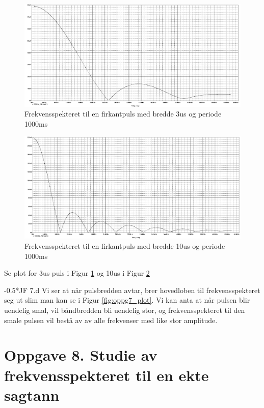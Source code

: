 \documentclass[norsk, a4paper]{article}
\makeatletter
\renewcommand{\subsubsection}{\@startsection{subsubsection}{3}{-2cm}%
{-\baselineskip}{0.5\baselineskip}{\bf\large}}
\newcommand{\jf}[1]{\subsubsection*{JF #1}\vspace*{-2\baselineskip}}
\makeatother
\begin{document}
\begin{figure}
  \begin{center}
      \includegraphics[width= 1\textwidth]{Figurer/oppg7_3us.png}
       \caption{Frekvensspekteret til en firkantpuls med bredde 3us og periode 1000ms}\label{fig:oppg7_3us}
  \end{center}
\end{figure}
\begin{figure}
  \begin{center}
      \includegraphics[width= 1\textwidth]{Figurer/oppg7_10us.png}
       \caption{Frekvensspekteret til en firkantpuls med bredde 10us og periode 1000ms}\label{fig:oppg7_10us}
  \end{center}
\end{figure}

Se plot for 3us puls i Figur \ref{fig:oppg7_3us} og 10us i Figur \ref{fig:oppg7_10us}

\jf{7.d}
Vi ser at når pulsbredden avtar, brer hovedloben til frekvensspekteret seg ut slim man kan se i Figur \ref{fig:oppg7_plot}. Vi kan anta at når pulsen blir uendelig smal, vil båndbredden bli uendelig stor, og frekvensspekteret til den smale pulsen vil bestå av av alle frekvenser med like stor amplitude.

\section{Oppgave 8. Studie av frekvensspekteret til en ekte sagtann}
\end{document}

